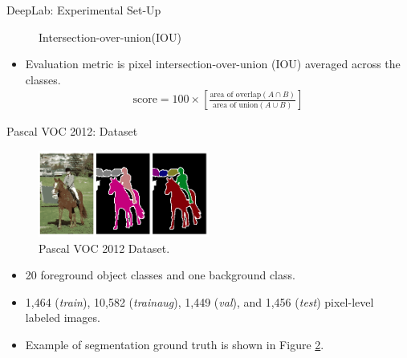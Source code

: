 \documentclass{beamer}
\begin{document}
\begin{frame}{DeepLab: Experimental Set-Up }
	\vspace{-0.5cm}
\begin{figure}
	\centering
	\caption{Intersection-over-union(IOU) } \label{fig:M1}
\end{figure}
\vspace{-0.5cm}
\begin{itemize}
	\item Evaluation metric is pixel intersection-over-union ({\color{blue}IOU}) averaged across the classes.
\begin{align*}
	\text{score} = 100\times\left[ \frac{\text{area of overlap}(A\cap B)}{\text{area of union}(A\cup B)}\right] 
\end{align*}
\end{itemize}

\end{frame}
\begin{frame}{Pascal VOC 2012: Dataset}
\begin{figure}
	\centering
	\includegraphics[width=0.50\textwidth]{figure/ss36.png}
	\captionsetup{justification=centering}
	\caption{Pascal VOC 2012 Dataset.}
	\label{fig:M5}
\end{figure}
\vspace{-0.5cm}
\begin{itemize}
	\item 20 foreground object classes and one background class.
	\item {\color{blue}1,464} (\textit{train}), {\color{blue}10,582} (\textit{trainaug}),  {\color{blue}1,449} (\textit{val}), and  {\color{blue}1,456} (\textit{test}) pixel-level labeled images.
	\item Example of segmentation ground truth is shown in {\color{blue}Figure \ref{fig:M5}}.
\end{itemize}
\end{frame}
\end{document}
